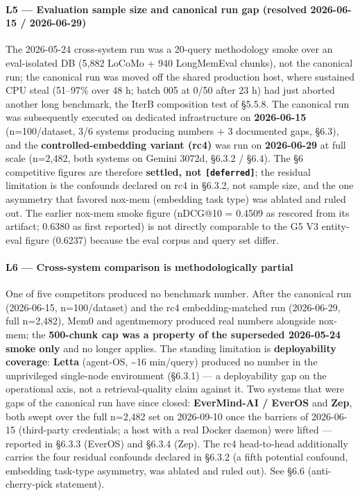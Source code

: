 \documentclass[
]{article}
\begin{document}
\paragraph{L5 --- Evaluation sample size and canonical run gap (resolved
2026-06-15 /
2026-06-29)}\label{l5-evaluation-sample-size-and-canonical-run-gap-resolved-2026-06-15-2026-06-29}

The 2026-05-24 cross-system run was a 20-query methodology smoke over an
eval-isolated DB (5,882 LoCoMo + 940 LongMemEval chunks), not the
canonical run; the canonical run was moved off the shared production
host, where sustained CPU steal (51--97\% over 48 h; batch 005 at 0/50
after 23 h) had just aborted another long benchmark, the IterB
composition test of §5.5.8. The canonical run was subsequently executed
on dedicated infrastructure on \textbf{2026-06-15} (n=100/dataset, 3/6
systems producing numbers + 3 documented gaps, §6.3), and the
\textbf{controlled-embedding variant (rc4)} was run on
\textbf{2026-06-29} at full scale (n=2,482, both systems on Gemini
3072d, §6.3.2 / §6.4). The §6 competitive figures are therefore
\textbf{settled, not \texttt{{[}deferred{]}}}; the residual limitation
is the confounds declared on rc4 in §6.3.2, not sample size, and the one
asymmetry that favored nox-mem (embedding task type) was ablated and
ruled out. The earlier nox-mem smoke figure (nDCG@10 = 0.4509 as
rescored from its artifact; 0.6380 as first reported) is not directly
comparable to the G5 V3 entity-eval figure (0.6237) because the eval
corpus and query set differ.

\paragraph{L6 --- Cross-system comparison is methodologically
partial}\label{l6-cross-system-comparison-is-methodologically-partial}

One of five competitors produced no benchmark number. After the
canonical run (2026-06-15, n=100/dataset) and the rc4 embedding-matched
run (2026-06-29, full n=2,482), Mem0 and agentmemory produced real
numbers alongside nox-mem; the \textbf{500-chunk cap was a property of
the superseded 2026-05-24 smoke only} and no longer applies. The
standing limitation is \textbf{deployability coverage}: \textbf{Letta}
(agent-OS, \textasciitilde16 min/query) produced no number in the
unprivileged single-node environment (§6.3.1) --- a deployability gap on
the operational axis, not a retrieval-quality claim against it. Two
systems that were gaps of the canonical run have since closed:
\textbf{EverMind-AI / EverOS} and \textbf{Zep}, both swept over the full
n=2,482 set on 2026-09-10 once the barriers of 2026-06-15 (third-party
credentials; a host with a real Docker daemon) were lifted --- reported
in §6.3.3 (EverOS) and §6.3.4 (Zep). The rc4 head-to-head additionally
carries the four residual confounds declared in §6.3.2 (a fifth
potential confound, embedding task-type asymmetry, was ablated and ruled
out). See §6.6 (anti-cherry-pick statement).
\end{document}

